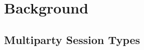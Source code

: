 \chapter{Background}
\section{Multiparty Session Types \cite{coppoGentleIntroductionMultiparty2015}}